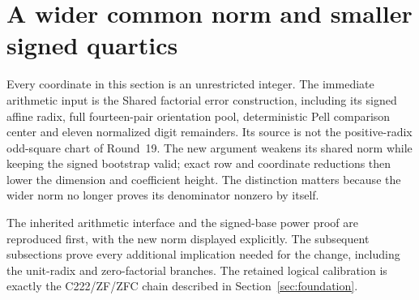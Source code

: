 \section{A wider common norm and smaller signed quartics}
\label{sec:signed}
Every coordinate in this section is an unrestricted integer. The immediate
arithmetic input is the Shared factorial error construction, including its
signed affine radix, full fourteen-pair orientation pool, deterministic
Pell comparison center and eleven normalized digit remainders. Its source
is not the positive-radix odd-square chart of Round~19. The new argument
weakens its shared norm while keeping the signed bootstrap valid; exact
row and coordinate reductions then lower the dimension and coefficient
height. The distinction matters because the wider norm no longer proves
its denominator nonzero by itself.

The inherited arithmetic interface and the signed-base power proof are
reproduced first, with the new norm displayed explicitly. The subsequent
subsections prove every additional implication needed for the change,
including the unit-radix and zero-factorial branches. The retained logical
calibration is exactly the C222/ZF/ZFC chain described in
Section~\ref{sec:foundation}.





